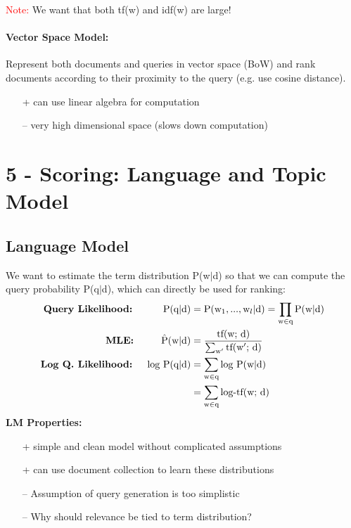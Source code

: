 \documentclass[a4paper,11pt]{article}
\newcommand{\msection}[1]{\section{#1}\vspace{-0.5mm}}
\newcommand{\tf}{\text{tf(w; d)}} %
\begin{document}
\begin{multicols}{2}
\textcolor{red}{Note:} We want that both tf(w) and idf(w) are large!

\paragraph{Vector Space Model:} Represent both documents and queries in vector space (BoW) and rank documents according to their proximity to the query (e.g. use cosine distance).
\begin{itemize}[leftmargin=0.3cm]
  \item [+] can use linear algebra for computation
  \item [--] very high dimensional space (slows down computation)
\end{itemize}

\msection{5 - Scoring: Language and Topic Model}
\subsection{Language Model}
We want to estimate the term distribution P(w$|$d) so that we can compute the query probability P(q$|$d), which can directly be used for ranking:
\begin{align*}
  \textbf{Query Likelihood: }& &\text P(\text q | \text d) &= \text P(\text w_1, ... , \text w_l | \text d) = \prod_{\text w \in \text q} \text P(\text w | \text d)\\
  \textbf{MLE: }&  &\hat{\text{P}}(\text w | \text d) &= \frac{\tf}{\sum_{\text w'} \text{tf(w$'$; d)}}\\
  \textbf{Log Q. Likelihood: }& &\text{log P}(\text q | \text d) &= \sum_{\text w \in \text q} \text{log P}(\text w | \text d) \\ 
  &&&= \sum_{\text w \in \text q} \text{log-tf(w; d)}
\end{align*}
\textbf{LM Properties:}
\begin{itemize}[leftmargin=0.3cm]
  \item [+] simple and clean model without complicated assumptions
  \item [+] can use document collection to learn these distributions
  \item [--] Assumption of query generation is too simplistic
  \item [--] Why should relevance be tied to term distribution?
\end{itemize}

\end{multicols}
\end{document}

